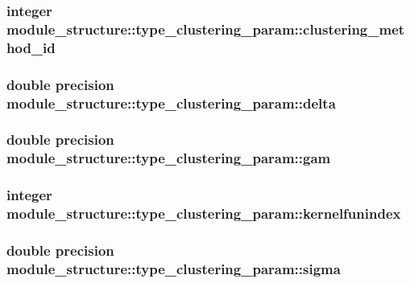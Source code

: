 \subsubsection[{clustering\+\_\+method\+\_\+id}]{\setlength{\rightskip}{0pt plus 5cm}integer module\+\_\+structure\+::type\+\_\+clustering\+\_\+param\+::clustering\+\_\+method\+\_\+id}\label{structmodule__structure_1_1type__clustering__param_a8bf29172007ac2bb0927ec135406618e}
\hypertarget{structmodule__structure_1_1type__clustering__param_a63047cf3dfca24f6c1647a1ee2b49f16}{}
\subsubsection[{delta}]{\setlength{\rightskip}{0pt plus 5cm}double precision module\+\_\+structure\+::type\+\_\+clustering\+\_\+param\+::delta}\label{structmodule__structure_1_1type__clustering__param_a63047cf3dfca24f6c1647a1ee2b49f16}
\hypertarget{structmodule__structure_1_1type__clustering__param_ab899422852cb7f39a9dfeef2c3bed12f}{}
\subsubsection[{gam}]{\setlength{\rightskip}{0pt plus 5cm}double precision module\+\_\+structure\+::type\+\_\+clustering\+\_\+param\+::gam}\label{structmodule__structure_1_1type__clustering__param_ab899422852cb7f39a9dfeef2c3bed12f}
\hypertarget{structmodule__structure_1_1type__clustering__param_a1005f14a680a96a6b66bd82783d2153d}{}
\subsubsection[{kernelfunindex}]{\setlength{\rightskip}{0pt plus 5cm}integer module\+\_\+structure\+::type\+\_\+clustering\+\_\+param\+::kernelfunindex}\label{structmodule__structure_1_1type__clustering__param_a1005f14a680a96a6b66bd82783d2153d}
\hypertarget{structmodule__structure_1_1type__clustering__param_a59a4870d2f3810136942a6f1ec116d0d}{}
\subsubsection[{sigma}]{\setlength{\rightskip}{0pt plus 5cm}double precision module\+\_\+structure\+::type\+\_\+clustering\+\_\+param\+::sigma}\label{structmodule__structure_1_1type__clustering__param_a59a4870d2f3810136942a6f1ec116d0d}
